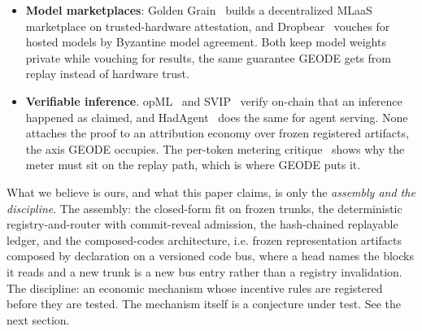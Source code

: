 \documentclass[11pt]{article}
\begin{document}
\begin{itemize}
          intelligence market~\cite{bittensor} is the closest overall
          neighbor; GEODE differs in its frozen-and-replayable stance and in
          measuring contribution by held-out utility rather than by
          staking-for-emission (locking money to earn newly created tokens).
          An independent empirical critique of Bittensor's tokenomics and
          incentives~\cite{bittensor2025critique} records the failure modes
          GEODE's rules are built to avoid.
    \item \textbf{Model marketplaces}: Golden
          Grain~\cite{goldengrain2020} builds a decentralized MLaaS
          marketplace on trusted-hardware attestation, and
          Dropbear~\cite{dropbear2022} vouches for hosted models by Byzantine
          model agreement. Both keep model weights private while vouching for
          results, the same guarantee GEODE gets from replay instead of
          hardware trust.
    \item \textbf{Verifiable inference}. opML~\cite{opml2024} and
          SVIP~\cite{svip2024} verify on-chain that an inference happened as
          claimed, and HadAgent~\cite{hadagent2026} does the same for agent
          serving. None attaches the proof to an attribution economy over
          frozen registered artifacts, the axis GEODE occupies. The
          per-token metering critique~\cite{tokeninflation2026} shows why the
          meter must sit on the replay path, which is where GEODE puts it.
\end{itemize}

What we believe is ours, and what this paper claims, is only the
\emph{assembly and the discipline}. The assembly: the closed-form
fit on frozen trunks, the deterministic registry-and-router with
commit-reveal admission, the hash-chained replayable ledger, and
the composed-codes architecture, i.e. frozen representation artifacts
composed by declaration on a versioned code bus, where a head
names the blocks it reads and a new trunk is a new bus entry
rather than a registry invalidation. The discipline: an economic
mechanism whose incentive rules are registered before they are
tested. The mechanism itself is a conjecture under test. See the
next section.
\end{document}
